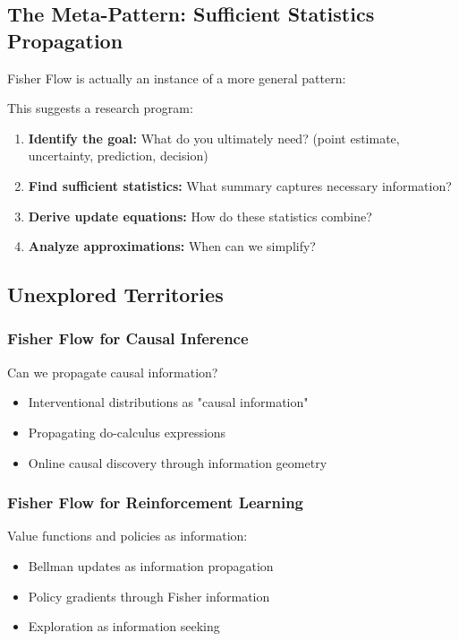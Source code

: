 \documentclass[11pt]{article}
\begin{document}
\subsection{The Meta-Pattern: Sufficient Statistics Propagation}

Fisher Flow is actually an instance of a more general pattern:

\begin{center}
\end{center}

This suggests a research program:
\begin{enumerate}
\item \textbf{Identify the goal:} What do you ultimately need? (point estimate, uncertainty, prediction, decision)
\item \textbf{Find sufficient statistics:} What summary captures necessary information?
\item \textbf{Derive update equations:} How do these statistics combine?
\item \textbf{Analyze approximations:} When can we simplify?
\end{enumerate}

\subsection{Unexplored Territories}

\subsubsection{Fisher Flow for Causal Inference}
Can we propagate causal information?
\begin{itemize}
\item Interventional distributions as "causal information"
\item Propagating do-calculus expressions
\item Online causal discovery through information geometry
\end{itemize}

\subsubsection{Fisher Flow for Reinforcement Learning}
Value functions and policies as information:
\begin{itemize}
\item Bellman updates as information propagation
\item Policy gradients through Fisher information
\item Exploration as information seeking
\end{itemize}
\end{document}
